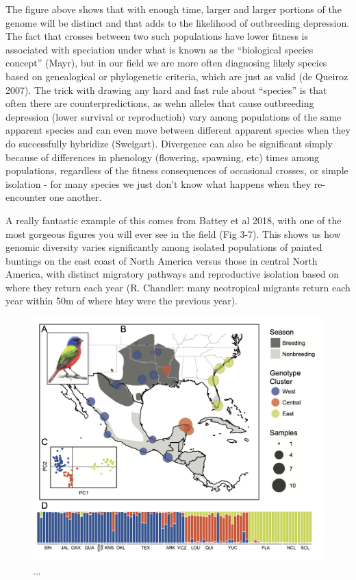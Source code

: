\documentclass[
]{article}
\begin{document}
The figure above shows that with enough time, larger and larger portions
of the genome will be distinct and that adds to the likelihood of
outbreeding depression. The fact that crosses between two such
populations have lower fitness is associated with speciation under what
is known as the ``biological species concept'' (Mayr), but in our field
we are more often diagnosing likely species based on genealogical or
phylogenetic criteria, which are just as valid (de Queiroz 2007). The
trick with drawing any hard and fast rule about ``species'' is that
often there are counterpredictions, as wehn alleles that cause
outbreeding depression (lower survival or reproductioh) vary among
populations of the same apparent species and can even move between
different apparent species when they do successfully hybridize
(Sweigart). Divergence can also be significant simply because of
differences in phenology (flowering, spawning, etc) times among
populations, regardless of the fitness consequences of occasional
crosses, or simple isolation - for many species we just don't know what
happens when they re-encounter one another.

A really fantastic example of this comes from Battey et al 2018, with
one of the most gorgeous figures you will ever see in the field (Fig
3-7). This shows us how genomic diversity varies significantly among
isolated populations of painted buntings on the east coast of North
America versus those in central North America, with distinct migratory
pathways and reproductive isolation based on where they return each year
(R. Chandler: many neotropical migrants return each year within 50m of
where htey were the previous year).

\begin{figure}

{\centering \includegraphics[width=0.9\linewidth]{MEImages/Battey1} 

}

\caption{...}\label{fig:unnamed-chunk-9}
\end{figure}
\end{document}
